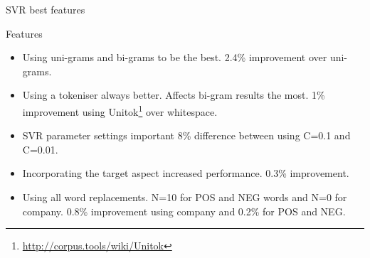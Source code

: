 \documentclass[10pt]{beamer}
\begin{document}
\begin{frame}[fragile]{SVR best features}
\begin{block}{Features}
\begin{itemize}
\item Using uni-grams and bi-grams to be the best. 2.4\% improvement over uni-grams.
\item Using a tokeniser always better. Affects bi-gram results the most. 1\% improvement using Unitok\footnote{\url{http://corpus.tools/wiki/Unitok}} over whitespace.
\item SVR parameter settings important 8\% difference between using C=0.1 and C=0.01. 
\item Incorporating the target aspect increased performance. 0.3\% improvement.
\item Using all word replacements. N=10 for POS and NEG words and N=0 for company. 0.8\% improvement using company and 0.2\% for POS and NEG.
\end{itemize}
\end{block}

\end{frame}
\end{document}
